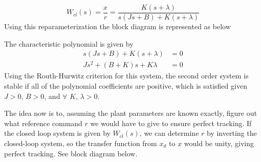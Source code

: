 \begin{equation*}
  W_{cl}(s)=\frac{x}{r}=\frac{K(s+\lambda)}{s(Js+B)+K(s+\lambda)}
\end{equation*}
Using this reparameterization the block diagram is represented as below

\begin{figure}[H]
  \begin{center}
  \end{center}
\end{figure}

\noindent The characteristic polynomial is given by
\begin{equation*}
  \begin{split}
    s(Js+B)+K(s+\lambda)&=0 \\
    Js^{2}+(B+K)s+K\lambda&=0
  \end{split}
\end{equation*}
Using the Routh-Hurwitz criterion for this system, the second order system is stable if all of the polynomial coefficients are positive, which is satisfied given $J>0$, $B>0$, and $\forall$ $K$, $\lambda>0$.

The idea now is to, assuming the plant parameters are known exactly, figure out what reference command $r$ we would have to give to ensure perfect tracking.
If the closed loop system is given by $W_{cl}(s)$, we can determine $r$ by inverting the closed-loop system, so the transfer function from $x_{d}$ to $x$ would be unity, giving perfect tracking.
See block diagram below.

